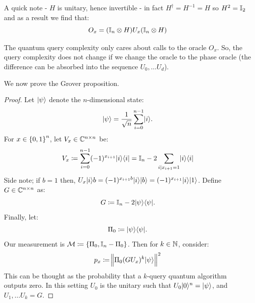 A quick note - $H$ is unitary, hence invertible - in fact $H^\dag = H^{-1} = H$ so $H^2 = \mathbb{I}_2$ and as a result we find that:
\begin{equation}
    O_x = (\mathbb{I}_n \otimes H)U_x(\mathbb{I}_n \otimes H)
\end{equation}

The quantum query complexity only cares about calls to the oracle $O_x$. So, the query complexity does not change if we change the oracle to the phase oracle (the difference can be absorbed into the sequence $U_0, \ldots U_d$).

We now prove the Grover proposition.

\begin{proof}
    Let $\lvert \psi \rangle$ denote the $n$-dimensional state:
    \begin{equation}
        \lvert \psi \rangle = \frac{1}{\sqrt{n}}\sum_{i=0}^{n-1}\lvert i \rangle.
    \end{equation}
    For $x \in \set{0, 1}^n$, let $V_x \in \mathbb{C}^{n \times n}$ be:
    \begin{equation}
        V_x\coloneqq \sum_{i=0}^{n-1}(-1)^{x_{i+1}}\lvert i \rangle \langle i \rvert = \mathbb{I}_n - 2\sum_{i\vert x_{i+1} = 1}\lvert i \rangle \langle i \rvert
    \end{equation}
    Side note; if $b = 1$ then, $U_x\lvert i \rangle{b} = (-1)^{x_{i+1}b}\lvert i \rangle\lvert b \rangle = (-1)^{x_{i+1}}\lvert i \rangle\lvert 1 \rangle$. 
    Define $G \in \mathbb{C}^{n \times n}$ as:
    \begin{equation}
        G \coloneqq \mathbb{I}_n - 2\lvert \psi \rangle \langle \psi \rvert.
    \end{equation}
    Finally, let:
    \begin{equation}
        \Pi_0 \coloneqq \lvert \psi \rangle \langle \psi \rvert.
    \end{equation}
    Our measurement is $\mathcal{M} \coloneqq \set{\Pi_0, \mathbb{I}_n - \Pi_0}$. Then for $k \in \mathbb{N}$, consider:
    \begin{equation}
        p_x \coloneqq \norm{\Pi_0(GU_x)^k\lvert \psi \rangle}^2
    \end{equation}
    This can be thought as the probability that a $k$-query quantum algorithm outputs zero. In this setting $U_0$ is the unitary such that $U_0\lvert 0 \rangle^n = \lvert \psi \rangle$, and $U_1, \ldots U_k = G$. 


\end{proof}
